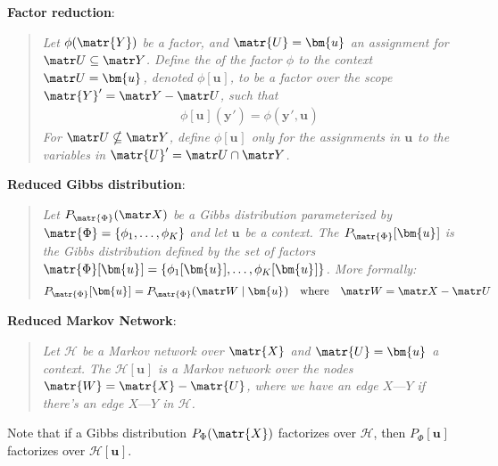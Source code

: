 \documentclass[11pt]{article}
\renewcommand\vec[2][]{\bm{#2}_{#1}}
\newcommand\p{\Needspace{10\baselineskip} \noindent}
\begin{document}
\p \textbf{Factor reduction}:
\vspace{-0.5em}
\begin{quote}
	{\itshape Let $\phi(\matr{Y})$ be a factor, and $\matr{U} = \vec{u}$ an assignment for $\matr U \subseteq \matr Y$. Define the  of the factor $\phi$ to the context $\matr U = \vec u$, denoted $\phi[\vec u]$, to be a factor over the scope $\matr{Y}' = \matr Y - \matr U$, such that
		\begin{align}
			\phi[\vec u](\vec{y}') = \phi(\vec{y}', \vec u)
		\end{align}
	For $\matr U \nsubseteq \matr Y$, define $\phi[\vec u]$ only for the assignments in $\vec u$ to the variables in $\matr{U}' = \matr U \cap \matr Y$. 
	}
\end{quote}

\p \textbf{Reduced Gibbs distribution}:
\vspace{-0.5em}
\begin{quote}
	{\itshape Let $P_{\matr{\Phi}}(\matr X)$ be a Gibbs distribution parameterized by $\matr{\Phi} = \{\phi_1, \ldots, \phi_K\}$ and let $\vec u$ be a context. The  $P_{\matr{\Phi}}[\vec u]$ is the Gibbs distribution defined by the set of factors $\matr{\Phi}[\vec u] = \{\phi_1[\vec u], \ldots, \phi_K[\vec u] \}$. More formally:
		\begin{align}
			P_{\matr{\Phi}}[\vec u] = P_{\matr{\Phi}}(\matr W \mid \vec u) \quad \text{where} \quad \matr W = \matr X - \matr U
		\end{align}
	}
\end{quote}

\p \textbf{Reduced Markov Network}:
\vspace{-1em}
\begin{quote}
	{\itshape Let $\mathcal H$ be a Markov network over $\matr{X}$ and $\matr{U} = \vec{u}$ a context. The  $\mathcal{H}[\vec{u}]$ is a Markov network over the nodes $\matr{W} = \matr{X} - \matr{U}$, where we have an edge $X \text{---} Y$ if there's an edge $X \text{---} Y$ in $\mathcal H$. 
	}
\end{quote}
Note that if a Gibbs distribution $P_{\Phi}(\matr{X})$ factorizes over $\mathcal H$, then $P_{\Phi}[\vec u]$ factorizes over $\mathcal{H}[\vec u]$. 
\end{document}

